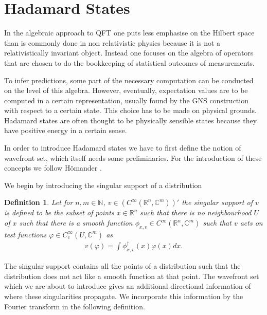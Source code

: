 \documentclass[a4paper,11pt]{article}
\newtheorem{de}{Definition}
\begin{document}
\section{Hadamard States}\label{sec:hadamard}
In the algebraic approach to QFT one puts less emphasise on the Hilbert space than is commonly done in non relativistic physics because 
it is not a relativistically invariant object.
Instead one focuses on the algebra of operators that are chosen to do the bookkeeping of statistical outcomes of measurements. 

To infer predictions, some part of the necessary computation can be conducted on the level of this algebra. However,
eventually, expectation values are to be computed in a certain representation, usually found by the GNS construction
with respect to a certain state.
This choice has to be made on physical grounds. 
Hadamard states are often thought to be physically sensible states because they have positive energy in a certain sense.

In order to introduce Hadamard states we have to first define the notion of wavefront set, which itself needs some preliminaries. 
For the introduction of these concepts we follow Hömander \cite[Chapter 8]{hormander2003analysis}.

We begin by introducing the singular support of a distribution

\begin{de}
Let for \(n,m\in\mathbb{N}\),  \(v\in (C^\infty(\mathbb{R}^n,\mathbb{C}^m))'\) the singular support of \(v\) is defined to be the subset of points \(x\in \mathbb{R}^n\) such
that there is no neighbourhood \(U\) of \(x\) such that there is a smooth function \(\phi_{x,v}\in C^\infty (\mathbb{R}^n,\mathbb{C}^m)\) such that \(v\) acts on 
test functions \(\varphi \in C^\infty_c (U,\mathbb{C}^m)\) as
\begin{align}
v(\varphi)=\int \phi^\dagger_{x,v} (x) \varphi(x) dx.
\end{align}
\end{de}

The singular support contains all the points of a distribution such that the distribution does not act like a smooth function at that point. The wavefront set which we are
about to introduce gives an additional directional information of where these singularities propagate. We incorporate this information by the Fourier transform 
in the following definition.
\end{document}

